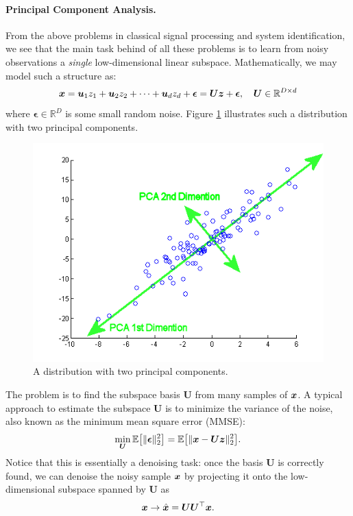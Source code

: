 \documentclass[../../book-main.tex]{subfiles}
\begin{document}
\paragraph{Principal Component Analysis.}
From the above problems in classical signal processing and system identification, we see that the main task behind of all these problems is to learn from noisy observations a {\em single} low-dimensional linear subspace. Mathematically, we may model such a structure as:
\begin{equation}
    \bm{x} = \boldsymbol{u}_1 z_1 + \boldsymbol{u}_2 z_2 + \cdots + \boldsymbol{u}_d z_d + \boldsymbol{\epsilon} =  \boldsymbol{U} \bm{z} + \boldsymbol{\epsilon}, \quad \boldsymbol{U} \in \mathbb{R}^{D\times d}
    \label{eqn:PCA-model}
\end{equation}
where $\boldsymbol{\epsilon} \in \mathbb{R}^D$ is some small random noise. Figure \ref{fig:PCA} illustrates such a distribution with two principal components.
\begin{figure}
    \centering
    \includegraphics[width=0.5\linewidth]{figures/PCA.png}
    \caption{A distribution with two principal components.}
    \label{fig:PCA}
\end{figure}
The problem is to find the subspace basis $\boldsymbol{U}$ from many samples of $\bm{x}$. A typical approach to estimate the subspace $\boldsymbol{U}$ is to minimize the variance of the noise, also known as the minimum mean square error (MMSE):
\begin{equation}
    \min_{\boldsymbol{U}} \mathbb{E}\big[\|\boldsymbol{\epsilon}\|_2^2\big] = \mathbb{E}\big[\|\bm{x} - \boldsymbol{U} \bm{z}\|_2^2\big].
\end{equation}
Notice that this is essentially a denoising task: once the basis $\boldsymbol{U}$ is correctly found, we can denoise the noisy sample $\bm{x}$ by projecting it onto the low-dimensional subspace spanned by $\boldsymbol{U}$ as 
\begin{equation}
\bm{x} \rightarrow \hat {\bm{x}} = \boldsymbol{U}\boldsymbol{U}^\top \bm{x}. 
\end{equation}
\end{document}
